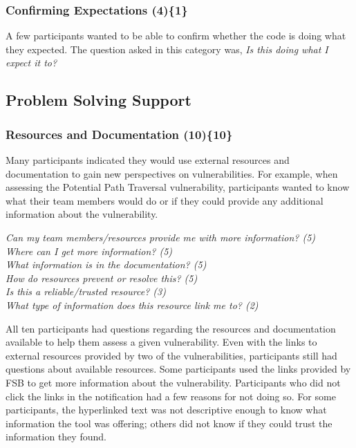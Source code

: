 \documentclass{acm_proc_article-sp}
\begin{document}

\subsubsection{\textbf{Confirming Expectations (4)\{1\}}}\label{ce}

A few participants wanted to be able to confirm whether the code is doing what they expected. 
The question asked in this category was, \textit{Is this doing what I expect it to?} 



\subsection{Problem Solving Support}
\label{sec:results-pss}



\subsubsection{\textbf{Resources and Documentation (10)\{10\}}}\label{rd}

Many participants indicated they would use external resources and documentation to gain new perspectives on vulnerabilities.
For example, when assessing the Potential Path Traversal vulnerability, participants wanted to know what their team members would do or if they could provide any additional information about the vulnerability. 


\noindent\emph{Can my team members/resources provide me with more information? (5)} \\
\emph{Where can I get more information? (5)} \\
\emph{What information is in the documentation? (5)} \\
\emph{How do resources prevent or resolve this? (5)} \\
\emph{Is this a reliable/trusted resource? (3)} \\
\emph{What type of information does this resource link me to? (2)}

 
All ten participants had questions regarding the resources and documentation available to help them assess a given vulnerability. 
Even with the links to external resources provided by two of the vulnerabilities, participants still had questions about available resources. 
Some participants used the links provided by FSB to get more information about the vulnerability.
Participants who did not click the links in the notification had a few reasons for not doing so.
For some participants, the hyperlinked text was not descriptive enough to know what information the tool was offering; others did not know if they could trust the information they found.
\end{document}
